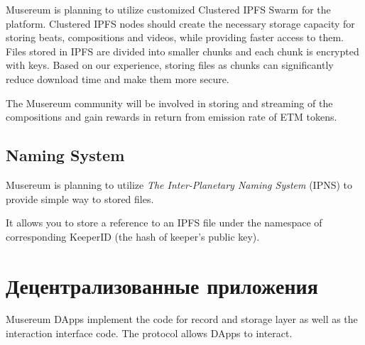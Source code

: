 \documentclass[12pt]{report}
\begin{document}
Musereum is planning to utilize customized Clustered IPFS Swarm for the platform. Clustered IPFS nodes should create the necessary storage capacity for storing beats, compositions and videos, while providing faster access to them. Files stored in IPFS are divided into smaller chunks and each chunk is encrypted with keys. Based on our experience, storing files as chunks can significantly reduce download time and make them more secure.

The Musereum community will be involved in storing and streaming of the compositions and gain rewards in return from emission rate of ETM tokens.
\subsection{Naming System}
\label{tech-storage-naming}
Musereum is planning to utilize \textit{The Inter-Planetary Naming System} (IPNS) to provide simple way to stored files. 

It allows you to store a reference to an IPFS file under the namespace of corresponding KeeperID (the hash of keeper's public key).

\section{Децентрализованные приложения}
\label{tech-apps}
Musereum DApps implement the code for record and storage layer as well as the interaction interface code. The protocol allows DApps to interact.
\end{document}
